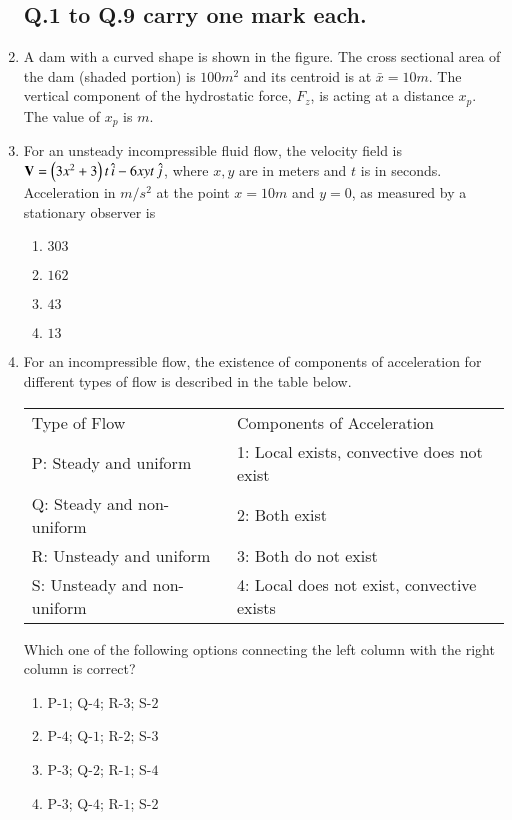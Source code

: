 \documentclass[journal]{IEEEtran}
\begin{document}
\begin{enumerate}
\subsection*{Q.1 to Q.9 carry one mark each.}

    \item A dam with a curved shape is shown in the figure. The cross sectional area of the dam (shaded portion) is $100m^2$ and its centroid is at $\bar{x}=10m$. The vertical component of the hydrostatic force, $F_z$, is acting at a distance $x_p$. The value of $x_p$ is \underline{\hspace{1.5cm}}$m$.
        \begin{figure}[!ht]
            \centering
            
        \end{figure}

    \item For an unsteady incompressible fluid flow, the velocity field is $\mathbf{V}=\left(3x^2+3\right)t\,\hat{i}-6xyt\,\hat{j}$, where $x,y$ are in meters and $t$ is in seconds. Acceleration in $m/s^2$ at the point $x=10m$ and $y=0$, as measured by a stationary observer is
        \begin{enumerate}
            \item $303$
            \item $162$
            \item $43$
            \item $13$
        \end{enumerate}

    \item For an incompressible flow, the existence of components of acceleration for different types of flow is described in the table below.

        \begin{tabular}{l l}
            Type of Flow & Components of Acceleration \\
            P: Steady and uniform & 1: Local exists, convective does not exist \\
            Q: Steady and non-uniform & 2: Both exist \\
            R: Unsteady and uniform & 3: Both do not exist \\
            S: Unsteady and non-uniform & 4: Local does not exist, convective exists \\
        \end{tabular}

        Which one of the following options connecting the left column with the right column is correct?
        \begin{enumerate}
            \item P-$1$; Q-$4$; R-$3$; S-$2$
            \item P-$4$; Q-$1$; R-$2$; S-$3$
            \item P-$3$; Q-$2$; R-$1$; S-$4$
            \item P-$3$; Q-$4$; R-$1$; S-$2$
        \end{enumerate}


\end{enumerate}
\end{document}
